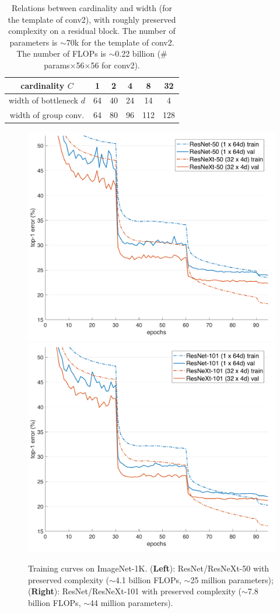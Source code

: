 \documentclass[10pt,twocolumn,letterpaper]{article}
\begin{document}
\renewcommand\arraystretch{1.0}
\setlength{\tabcolsep}{6pt}
\begin{table}[t]
\begin{center}
\footnotesize
\begin{tabular}{c|ccccc}
\hline
cardinality $C$ & 1 & 2 & 4 & 8 & 32 \\
\hline
width of bottleneck $d$ & 64 & 40 & 24 & 14 & 4 \\
width of group conv. & 64 & 80 & 96 & 112 & 128 \\
\hline
\end{tabular}
\end{center}
\caption{Relations between cardinality and width (for the template of conv2), with roughly preserved complexity on a residual block. The number of parameters is $\sim$70k for the template of conv2. The number of FLOPs is $\sim$0.22 billion (\# params$\times$56$\times$56 for conv2).
}
\label{tab:capacity}
\end{table}

\begin{figure}[t]
\centering
\vspace{-2em}
\includegraphics[width=.48\linewidth]{eps/resnet50}
\includegraphics[width=.48\linewidth]{eps/resnet101}
\caption{Training curves on ImageNet-1K. (\textbf{Left}): ResNet/ResNeXt-50 with preserved complexity ($\sim$4.1 billion FLOPs, $\sim$25 million parameters); (\textbf{Right}): ResNet/ResNeXt-101 with preserved complexity ($\sim$7.8 billion FLOPs, $\sim$44 million parameters).
}
\label{fig:curves-comp}
\end{figure}
\end{document}
